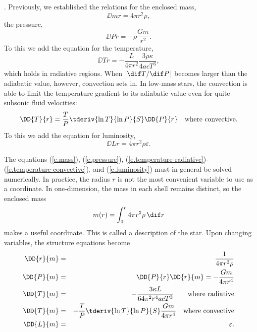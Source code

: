 . Previously, we established the relations for the enclosed mass,
\begin{equation}\label{e.mass}
\DD{m}{r} = 4\pi r^{2}\rho,
\end{equation}
the pressure,
\begin{equation}\label{e.pressure}
\DD{P}{r} = -\rho\frac{Gm}{r^{2}}.
\end{equation}
To this we add the equation for the temperature,
\begin{equation}\label{e.temperature-radiative}
\DD{T}{r} = - \frac{L}{4\pi r^{2}}\frac{3\rho\kappa}{4ac T^{3}},
\end{equation}
which holds in radiative regions. When $|\dif T/\dif P|$ becomes larger than the adiabatic value, however, convection sets in. In low-mass stars, the convection is able to limit the temperature gradient to its adiabatic value even for quite subsonic fluid velocities:
\begin{equation}
\label{e.temperature-convective}
\DD{T}{r} = \frac{T}{P}\tderiv{\ln T}{\ln P}{S}\DD{P}{r}\quad\textrm{where convective}.
\end{equation}
To this we add the equation for luminosity,
\begin{equation}
\label{e.luminosity}
\DD{L}{r} = 4\pi r^{2}\rho\varepsilon.
\end{equation}

\begin{sidebar}
\label{sb.lagrangian-equations}
The equations (\ref{e.mass}), (\ref{e.pressure}), (\ref{e.temperature-radiative})-(\ref{e.temperature-convective}), and (\ref{e.luminosity}) must in general be solved numerically. In practice, the radius $r$ is not the most convenient variable to use as a coordinate. In one-dimension, the mass in each shell remains distinct, so the enclosed mass
\[
	m(r) = \int_{0}^{r} 4\pi r^{2}\rho\,\dif r
\]
makes a useful coordinate. This is called a  description of the star.  Upon changing variables, the structure equations become
\begin{eqnarray}
\DD{r}{m} &=& \frac{1}{4\pi r^{2}\rho}\label{e.lagrange-r}\\
\DD{P}{m} &=& \DD{P}{r}\DD{r}{m} = -\frac{Gm}{4\pi r^{4}}\label{e.lagrange-P}\\
\DD{T}{m} &=& - \frac{3\kappa L}{64\pi^{2} r^{4} acT^{3}}\qquad \textrm{where radiative}\label{e.lagrange-T-radiative}\\
\DD{T}{m} &=& -\frac{T}{P}\tderiv{\ln T}{\ln P}{S}\frac{Gm}{4\pi r^{4}} \quad \textrm{where convective}\label{e.lagrange-T-convective}\\
\DD{L}{m} &=& \varepsilon.\label{e.lagrange-L}
\end{eqnarray}
\end{sidebar}

